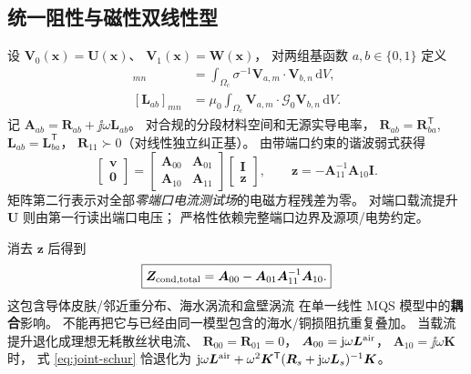\subsection{统一阻性与磁性双线性型}
设 \(\bm V_0(\bm x)=\bm U(\bm x)\)、
\(\bm V_1(\bm x)=\bm W(\bm x)\)，
对两组基函数 \(a,b\in\{0,1\}\) 定义
\begin{align}
[\bm R_{ab}]_{mn}
&=\int_{\Omega_c}\sigma^{-1}
\bm V_{a,m}\cdot\bm V_{b,n}\,\mathrm dV,
\\
[\bm L_{ab}]_{mn}
&=\mu_0\int_{\Omega_c}
\bm V_{a,m}\cdot\mathcal G_0\bm V_{b,n}\,\mathrm dV.
\end{align}
记 \(\bm A_{ab}=\bm R_{ab}+\jj\omega\bm L_{ab}\)。
对合规的分段材料空间和无源实导电率，
\(\bm R_{ab}=\bm R_{ba}^{\mathsf T}\),
\(\bm L_{ab}=\bm L_{ba}^{\mathsf T}\)，
\(\bm R_{11}\succ0\)（对线性独立纠正基）。
由带端口约束的谐波弱式获得
\begin{equation}
\begin{bmatrix}
\bm v\\ \bm 0
\end{bmatrix}
=
\begin{bmatrix}
\bm A_{00}&\bm A_{01}\\
\bm A_{10}&\bm A_{11}
\end{bmatrix}
\begin{bmatrix}
\bm I\\\bm z
\end{bmatrix},\qquad
\bm z=-\bm A_{11}^{-1}\bm A_{10}\bm I .
\label{eq:joint-system}
\end{equation}
矩阵第二行表示对全部\emph{零端口电流测试场}的电磁方程残差为零。
对端口载流提升 \(\bm U\) 则由第一行读出端口电压；
严格性依赖完整端口边界及源项/电势约定。

消去 \(\bm z\) 后得到
\begin{equation}
\boxed{
\bm Z_{\rm cond,total}
=\bm A_{00}-\bm A_{01}\bm A_{11}^{-1}\bm A_{10}.
}
\label{eq:joint-schur}
\end{equation}
这包含导体皮肤/邻近重分布、海水涡流和盒壁涡流
在单一线性 MQS 模型中的\textbf{耦合}影响。
不能再把它与已经由同一模型包含的海水/铜损阻抗重复叠加。
当载流提升退化成理想无耗散丝状电流、
\(\bm R_{00}=\bm R_{01}=0\)，
\(\bm A_{00}=\mathrm j\omega\bm L^{\rm air}\)，
\(\bm A_{10}=\jj\omega\bm K\) 时，
式 \eqref{eq:joint-schur} 恰退化为
\(\mathrm j\omega\bm L^{\rm air}+
\omega^2\bm K^{\mathsf T}
(\bm R_s+\mathrm j\omega\bm L_s)^{-1}\bm K\)。

